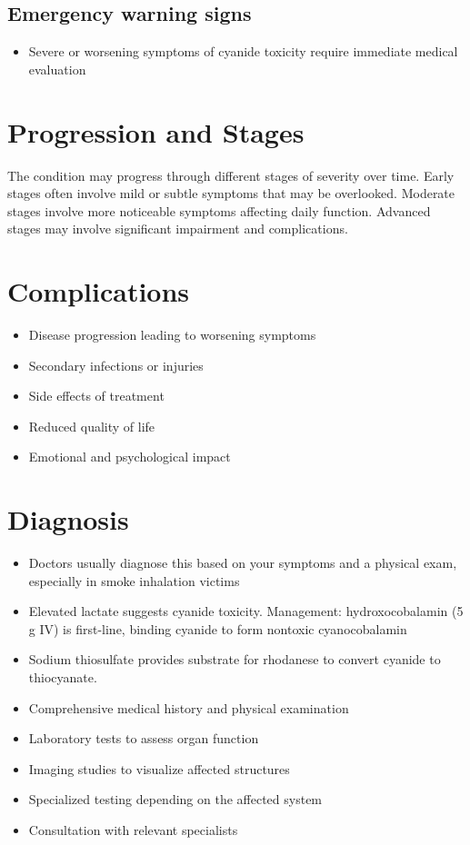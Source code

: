 \subsection{Emergency warning signs}
\begin{itemize}[noitemsep]
  \item Severe or worsening symptoms of cyanide toxicity require immediate medical evaluation
\end{itemize}
\section{Progression and Stages}
The condition may progress through different stages of severity over time. Early stages often involve mild or subtle symptoms that may be overlooked. Moderate stages involve more noticeable symptoms affecting daily function. Advanced stages may involve significant impairment and complications.
\section{Complications}
\begin{itemize}[noitemsep]
  \item Disease progression leading to worsening symptoms
  \item Secondary infections or injuries
  \item Side effects of treatment
  \item Reduced quality of life
  \item Emotional and psychological impact
\end{itemize}
\section{Diagnosis}
\begin{itemize}[noitemsep]
  \item Doctors usually diagnose this based on your symptoms and a physical exam, especially in smoke inhalation victims
  \item Elevated lactate suggests cyanide toxicity. Management: hydroxocobalamin (5 g IV) is first-line, binding cyanide to form nontoxic cyanocobalamin
  \item Sodium thiosulfate provides substrate for rhodanese to convert cyanide to thiocyanate.
  \item Comprehensive medical history and physical examination
  \item Laboratory tests to assess organ function
  \item Imaging studies to visualize affected structures
  \item Specialized testing depending on the affected system
  \item Consultation with relevant specialists
\end{itemize}
